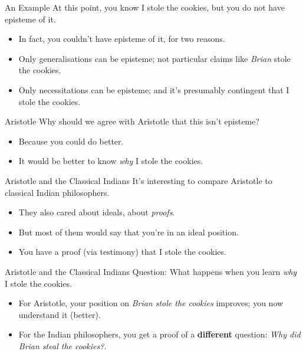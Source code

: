 \documentclass[
  17pt,
  letterpaper,
  ignorenonframetext,
  aspectratio=169,
]{beamer}
\providecommand{\tightlist}{%
  \setlength{\itemsep}{0pt}\setlength{\parskip}{0pt}}\usepackage{longtable,booktabs,array}
\begin{document}
\begin{frame}{An Example}
\protect\hypertarget{an-example-1}{}
At this point, you know I stole the cookies, but you do not have
episteme of it.

\begin{itemize}[<+->]
\tightlist
\item
  In fact, you couldn't have episteme of it, for two reasons.
\item
  Only generalisations can be episteme; not particular claims like
  \emph{Brian} stole the cookies.
\item
  Only necessitations can be episteme; and it's presumably contingent
  that I stole the cookies.
\end{itemize}
\end{frame}

\begin{frame}{Aristotle}
\protect\hypertarget{aristotle-1}{}
Why should we agree with Aristotle that this isn't episteme?

\begin{itemize}[<+->]
\tightlist
\item
  Because you could do better.
\item
  It would be better to know \emph{why} I stole the cookies.
\end{itemize}
\end{frame}

\begin{frame}{Aristotle and the Classical Indians}
\protect\hypertarget{aristotle-and-the-classical-indians}{}
It's interesting to compare Aristotle to classical Indian philosophers.

\begin{itemize}[<+->]
\tightlist
\item
  They also cared about ideals, about \emph{proofs}.
\item
  But most of them would say that you're in an ideal position.
\item
  You have a proof (via testimony) that I stole the cookies.
\end{itemize}
\end{frame}

\begin{frame}{Aristotle and the Classical Indians}
\protect\hypertarget{aristotle-and-the-classical-indians-1}{}
Question: What happens when you learn \emph{why} I stole the cookies.

\begin{itemize}[<+->]
\tightlist
\item
  For Aristotle, your position on \emph{Brian stole the cookies}
  improves; you now understand it (better).
\item
  For the Indian philosophers, you get a proof of a \textbf{different}
  question: \emph{Why did Brian steal the cookies?}.
\end{itemize}
\end{frame}
\end{document}
